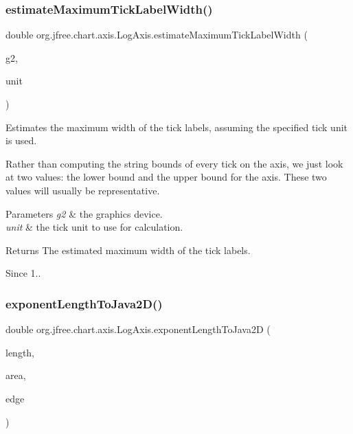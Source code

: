\subsubsection{\texorpdfstring{estimate\+Maximum\+Tick\+Label\+Width()}{estimateMaximumTickLabelWidth()}}
{\footnotesize\ttfamily double org.\+jfree.\+chart.\+axis.\+Log\+Axis.\+estimate\+Maximum\+Tick\+Label\+Width (\begin{DoxyParamCaption}\item[{Graphics2D}]{g2,  }\item[{\mbox{\hyperlink{classorg_1_1jfree_1_1chart_1_1axis_1_1_tick_unit}{Tick\+Unit}}}]{unit }\end{DoxyParamCaption})\hspace{0.3cm}{\ttfamily [protected]}}

Estimates the maximum width of the tick labels, assuming the specified tick unit is used. 

Rather than computing the string bounds of every tick on the axis, we just look at two values\+: the lower bound and the upper bound for the axis. These two values will usually be representative.


\begin{DoxyParams}{Parameters}
{\em g2} & the graphics device. \\
\hline
{\em unit} & the tick unit to use for calculation.\\
\hline
\end{DoxyParams}
\begin{DoxyReturn}{Returns}
The estimated maximum width of the tick labels.
\end{DoxyReturn}
\begin{DoxySince}{Since}
1.. 
\end{DoxySince}
\mbox{\label{classorg_1_1jfree_1_1chart_1_1axis_1_1_log_axis_ac523d2a9a7f4d5a745a4c9e40dea5fc4}} 
\subsubsection{\texorpdfstring{exponent\+Length\+To\+Java2\+D()}{exponentLengthToJava2D()}}
{\footnotesize\ttfamily double org.\+jfree.\+chart.\+axis.\+Log\+Axis.\+exponent\+Length\+To\+Java2D (\begin{DoxyParamCaption}\item[{double}]{length,  }\item[{Rectangle2D}]{area,  }\item[{Rectangle\+Edge}]{edge }\end{DoxyParamCaption})}

